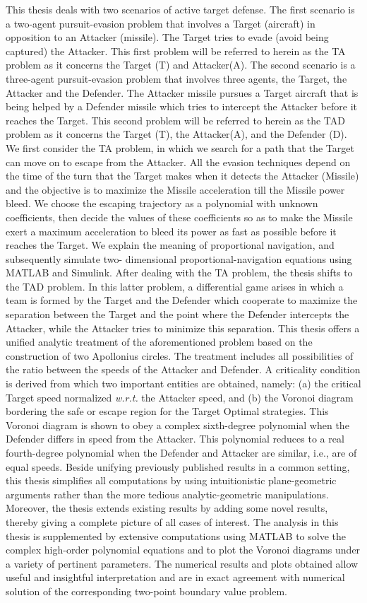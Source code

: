 
This thesis deals with two scenarios of active target defense. The first scenario is a two-agent pursuit-evasion problem that involves a Target (aircraft) in opposition to an Attacker (missile). The Target tries to evade (avoid being captured) the Attacker. This first problem will be referred to herein as the TA problem as it concerns the Target (T) and Attacker(A). The second scenario is a three-agent pursuit-evasion problem that involves three agents, the Target, the Attacker and the Defender. The Attacker missile pursues a Target aircraft that is being helped by a Defender missile which tries to intercept the Attacker before it reaches the Target. This second problem will be referred to herein as the TAD problem as it concerns the Target (T), the Attacker(A), and the Defender (D). We first consider the TA problem, in which we search for a path that the Target can move on to escape from the Attacker. All the evasion techniques depend on the time of the turn that the Target makes when it detects the Attacker (Missile) and the objective is to maximize the Missile acceleration till the Missile power bleed. We choose the escaping trajectory as a polynomial with unknown coefficients, then decide the values of these coefficients so as to make the Missile exert a maximum acceleration to bleed its power as fast as possible before it reaches the Target. We explain the meaning of proportional navigation, and subsequently simulate two- dimensional proportional-navigation equations using MATLAB and Simulink.
 After dealing with the TA problem, the thesis shifts to the TAD problem. In this latter problem, a differential game arises in which a team is formed by the Target and the Defender which cooperate to maximize the separation between the Target and the point where the Defender intercepts the Attacker, while the Attacker tries to minimize this separation. This thesis offers a unified analytic treatment of the aforementioned problem based on the construction of two Apollonius circles. The treatment includes all possibilities of the ratio between the speeds of the Attacker and Defender. A criticality condition is derived from which two important entities are obtained, namely: (a) the critical Target speed normalized \textit{w.r.t.} the Attacker speed, and (b) the Voronoi diagram bordering the safe or escape region for the Target Optimal strategies. This Voronoi diagram is shown to obey a complex sixth-degree polynomial when the Defender differs in speed from the Attacker. This polynomial reduces to a real fourth-degree polynomial when the Defender and Attacker are similar, i.e., are of equal speeds. Beside unifying previously published results in a common setting, this thesis simplifies all computations by using intuitionistic plane-geometric arguments rather than the more tedious analytic-geometric manipulations. Moreover, the thesis extends existing results by adding some novel results, thereby giving a complete picture of all cases of interest. The analysis in this thesis is supplemented by extensive computations using MATLAB to solve the complex high-order polynomial equations and to plot the Voronoi diagrams under a variety of pertinent parameters. The numerical results and plots obtained allow useful and insightful interpretation and are in exact agreement with numerical solution of the corresponding two-point boundary value problem.